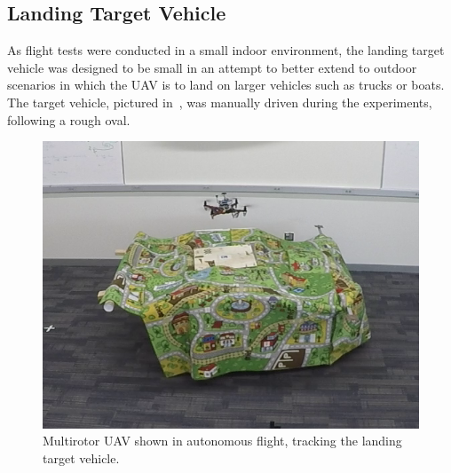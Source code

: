 
\subsection{Landing Target Vehicle}
As flight tests were conducted in a small indoor environment, the landing target
vehicle was designed to be small in an attempt to better extend to outdoor
scenarios in which the UAV is to land on larger vehicles such as trucks or boats.
The target vehicle, pictured in~, was manually
driven during the experiments, following a rough oval.

\begin{figure}
  \centering
  \includegraphics[scale=0.5]{imgs/landing_vehicle.png}
  \caption[UAV Tracking the Target Vehicle During Flight Experiment]{Multirotor
    UAV shown in autonomous flight, tracking the landing target
  vehicle.}
  \label{fig:landing_vehicle}
\end{figure}

